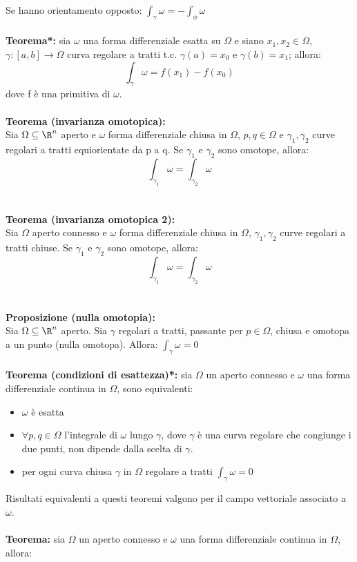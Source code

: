 \documentclass{article}
\begin{document}
Se hanno orientamento opposto: $\int_\gamma\omega=-\int_\phi\omega$\\\\
\textbf{Teorema*:} sia $\omega$ una forma differenziale esatta su $\Omega$ e siano $x_1,x_2\in\Omega$, $\gamma:[a,b]\rightarrow\Omega$ curva regolare a tratti t.c. $\gamma(a)=x_0$ e $\gamma(b)=x_1$; allora:
$$ \int_\gamma\omega=f(x_1)-f(x_0) $$
dove f è una primitiva di $\omega$.\\\\
\textbf{Teorema (invarianza omotopica):}\\
Sia $\Omega\subseteq\R^n$ aperto e $\omega$ forma differenziale chiusa in $\Omega$, $p,q\in\Omega$ e $\gamma_1,\gamma_2$ curve regolari a tratti equiorientate da p a q. Se $\gamma_1$ e $\gamma_2$ sono omotope, allora:
$$ \int_{\gamma_1}\omega=\int_{\gamma_2}\omega $$
\\\\
\textbf{Teorema (invarianza omotopica 2):}\\
Sia $\Omega$ aperto connesso e $\omega$ forma differenziale chiusa in $\Omega$, $\gamma_1,\gamma_2$ curve regolari a tratti chiuse. Se $\gamma_1$ e $\gamma_2$ sono omotope, allora:
$$ \int_{\gamma_1}\omega=\int_{\gamma_2}\omega $$
\\\\
\textbf{Proposizione (nulla omotopia):}\\
Sia $\Omega\subseteq\R^n$ aperto. Sia $\gamma$ regolari a tratti, passante per $p\in\Omega$, chiusa e omotopa a un punto (nulla omotopa). Allora: $\int_\gamma\omega=0$\\\\
\textbf{Teorema (condizioni di esattezza)*:} sia $\Omega$ un aperto connesso e $\omega$ una forma differenziale continua in $\Omega$, sono equivalenti:
\begin{itemize}
    \item $\omega$ è esatta
    \item $\forall p,q\in\Omega$ l'integrale di $\omega$ lungo $\gamma$, dove $\gamma$ è una curva regolare che congiunge i due punti, non dipende dalla scelta di $\gamma$.
    \item per ogni curva chiusa $\gamma$ in $\Omega$ regolare a tratti $\int_\gamma\omega=0$
\end{itemize}
Risultati equivalenti a questi teoremi valgono per il campo vettoriale associato a $\omega$.\\\\
\textbf{Teorema:} sia $\Omega$ un aperto connesso e $\omega$ una forma differenziale continua in $\Omega$, allora:
\end{document}
